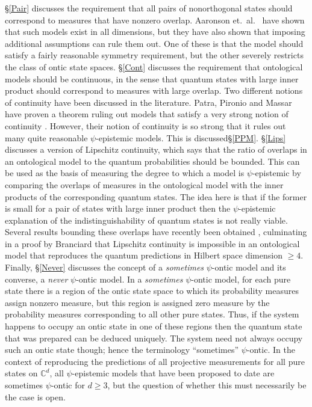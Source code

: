 \documentclass[DIV=calc,paper=a4,fontsize=11pt,twocolumn]{scrartcl} %
\theoremstyle{definition}
\theoremstyle{plain}
\begin{document}
\S\ref{Pair} discusses the requirement that all pairs of nonorthogonal
states should correspond to measures that have nonzero overlap.
Aaronson et.\ al.\ \cite{Aaronson2013} have shown that such models
exist in all dimensions, but they have also shown that imposing
additional assumptions can rule them out.  One of these is that the
model should satisfy a fairly reasonable symmetry requirement, but the
other severely restricts the class of ontic state spaces. \S\ref{Cont}
discusses the requirement that ontological models should be
continuous, in the sense that quantum states with large inner product
should correspond to measures with large overlap.  Two different
notions of continuity have been discussed in the literature.  Patra,
Pironio and Massar have proven a theorem ruling out models that
satisfy a very strong notion of continuity \cite{Patra2013a}.
However, their notion of continuity is so strong that it rules out
many quite reasonable $\psi$-epistemic models.  This is
discussed\S\ref{PPM}.  \S\ref{Lips} discusses a version of Lipschitz
continuity, which says that the ratio of overlaps in an ontological
model to the quantum probabilities should be bounded.  This can be
used as the basis of measuring the degree to which a model is
$\psi$-epistemic by comparing the overlaps of measures in the
ontological model with the inner products of the corresponding quantum
states.  The idea here is that if the former is small for a pair of
states with large inner product then the $\psi$-epistemic explanation
of the indistinguishability of quantum states is not really viable.
Several results bounding these overlaps have recently been obtained
\cite{Maroney2012, Barrett2013, Leifer2014, Branciard2014},
culminating in a proof by Branciard \cite{Branciard2014} that
Lipschitz continuity is impossible in an ontological model that
reproduces the quantum predictions in Hilbert space dimension $\geq
4$.  Finally, \S\ref{Never} discusses the concept of a
\emph{sometimes} $\psi$-ontic model and its converse, a \emph{never}
$\psi$-ontic model.  In a \emph{sometimes} $\psi$-ontic model, for
each pure state there is a region of the ontic state space to which
its probability measures assign nonzero measure, but this region is
assigned zero measure by the probability measures corresponding to all
other pure states.  Thus, if the system happens to occupy an ontic
state in one of these regions then the quantum state that was prepared
can be deduced uniquely.  The system need not always occupy such an
ontic state though; hence the terminology ``sometimes'' $\psi$-ontic.
In the context of reproducing the predictions of all projective
measurements for all pure states on $\mathbb{C}^d$, all
$\psi$-epistemic models that have been proposed to date are sometimes
$\psi$-ontic for $d \geq 3$, but the question of whether this must
necessarily be the case is open.
\end{document}
